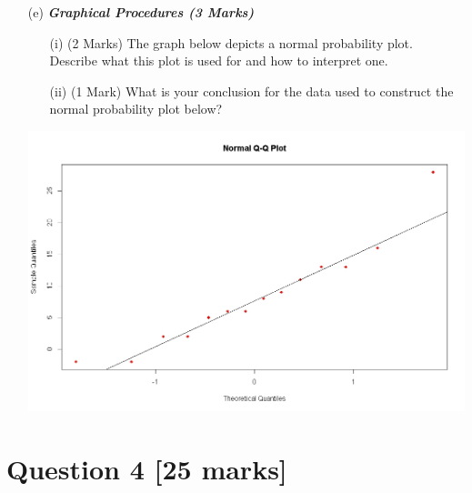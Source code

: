 \documentclass[a4paper,12pt]{article}
\begin{document}
\begin{itemize}
\item[(e)] \textbf{\textit{Graphical Procedures (3 Marks)}}
\begin{itemize}
\item[(i)] (2 Marks) The graph below depicts a normal probability plot. Describe what this plot is used for and how to interpret one.
\item[(ii)](1 Mark) What is your conclusion for the data used to construct the normal probability plot below?
\end{itemize}
\begin{center}
\includegraphics[scale=0.38]{10AQQplot}
\end{center}
\end{itemize}






\newpage
\section*{Question 4 [25 marks]}
\end{document}
